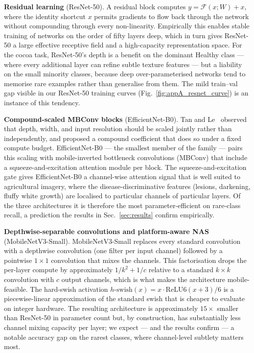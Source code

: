 \documentclass[conference,10pt]{IEEEtran}
\begin{document}
\textbf{Residual learning} (ResNet-50). A residual block computes
$y = \mathcal{F}(x; W) + x$, where the identity shortcut $x$ permits
gradients to flow back through the network without compounding through every
non-linearity. Empirically this enables stable training of networks on the
order of fifty layers deep, which in turn gives ResNet-50 a large effective
receptive field and a high-capacity representation space.
For the cocoa task, ResNet-50's depth is a benefit on the dominant Healthy
class — where every additional layer can refine subtle texture features —
but a liability on the small minority classes, because deep over-parameterised
networks tend to memorise rare examples rather than generalise from them. The
mild train--val gap visible in our ResNet-50 training curves
(Fig.~\ref{fig:appA_resnet_curve}) is an instance of this tendency.

\textbf{Compound-scaled MBConv blocks} (EfficientNet-B0). Tan and
Le~\cite{tan2019} observed that depth, width, and input resolution should be
scaled jointly rather than independently, and proposed a compound coefficient
that does so under a fixed compute budget. EfficientNet-B0 — the smallest
member of the family — pairs this scaling with mobile-inverted bottleneck
convolutions (MBConv) that include a squeeze-and-excitation
attention module per block. The squeeze-and-excitation gate gives
EfficientNet-B0 a channel-wise attention signal that is well suited to
agricultural imagery, where the disease-discriminative features (lesions,
darkening, fluffy white growth) are localised to particular channels of
particular layers. Of the three architectures it is therefore the most
parameter-efficient on rare-class recall, a prediction the
results in Sec.~\ref{sec:results} confirm empirically.

\textbf{Depthwise-separable convolutions and platform-aware NAS}
(MobileNetV3-Small). MobileNetV3-Small replaces every standard convolution
with a depthwise convolution (one filter per input channel) followed by a
pointwise $1\!\times\!1$ convolution that mixes the channels. This
factorisation drops the per-layer compute by approximately
$1/k^2 + 1/c$ relative to a standard $k\!\times\!k$ convolution with $c$
output channels, which is what makes the architecture mobile-feasible.
The hard-swish activation $h\!\text{-}\!\mathrm{swish}(x)=x\cdot
\mathrm{ReLU6}(x+3)/6$ is a piecewise-linear approximation of the standard
swish that is cheaper to evaluate on integer hardware. The resulting
architecture is approximately $15\times$ smaller than ResNet-50 in parameter
count but, by construction, has substantially less channel mixing capacity
per layer; we expect — and the results confirm — a notable accuracy gap on
the rarest classes, where channel-level subtlety matters most.
\end{document}
